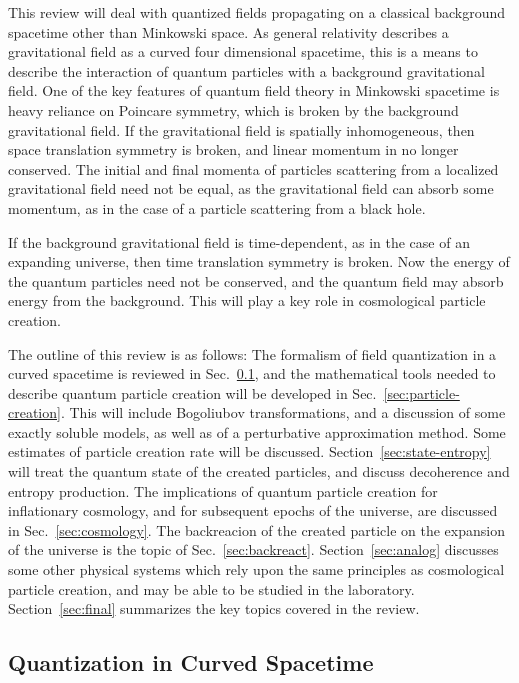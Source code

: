 \documentclass[12pt,onecolumn,eqsecnum,floats,aps,prd,floatfix,titlepage]{revtex4-2}
\begin{document}
This review will deal with quantized fields propagating on a classical background spacetime other than Minkowski
space. As general relativity describes a gravitational field as a curved four dimensional spacetime, this is a means
to describe the interaction of quantum particles with a background  gravitational field. One of the key features of
quantum field theory in Minkowski spacetime is heavy reliance on Poincare symmetry, which is broken by the
background  gravitational field. If the gravitational field is spatially inhomogeneous, then space translation symmetry
is broken, and linear momentum in no longer conserved. The initial and final momenta of particles scattering from
a localized gravitational field need not be equal, as the gravitational field can absorb some momentum, as in the case 
of a particle scattering from a black hole.  

If the background gravitational field is time-dependent, as in the case of an expanding universe, then time translation
symmetry is broken. Now the energy of the quantum particles need not be conserved, and the quantum field may
absorb energy from the background. This will play a key role in cosmological particle creation.

The outline of this review is as follows: The formalism of field quantization in a curved spacetime is reviewed in
Sec.~\ref{sec:quantization}, and the mathematical tools needed to describe quantum particle creation will be developed
in Sec.~\ref{sec:particle-creation}. This will include Bogoliubov transformations, and a discussion of some exactly
soluble models, as well as of a perturbative approximation method. Some estimates of particle creation rate will be
discussed. Section~\ref{sec:state-entropy} will treat the quantum state of the created particles, and discuss decoherence
and entropy production. The implications of quantum particle creation for inflationary cosmology, and for subsequent epochs
of the universe, are discussed in Sec.~\ref{sec:cosmology}. The backreacion of the created particle on the expansion of
the universe is the topic of Sec.~\ref{sec:backreact}. Section~\ref{sec:analog} discusses some other physical systems
which rely upon the same principles as cosmological particle creation, and may be able to be studied in the laboratory.
Section~\ref{sec:final} summarizes the key topics covered in the review.




\subsection{Quantization in Curved Spacetime}
\label{sec:quantization}
\end{document}
